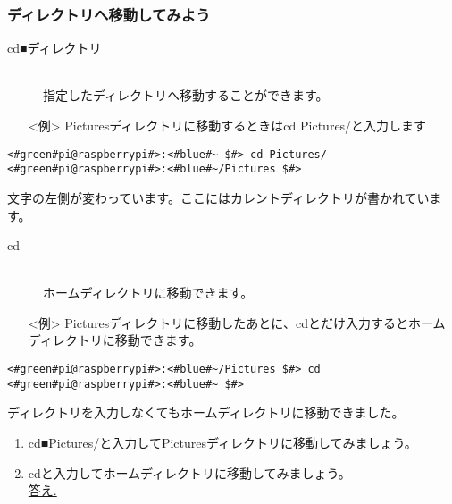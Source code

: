 \subsubsection{ディレクトリへ移動してみよう}
\begin{description}
\item[cd■ディレクトリ]\mbox{}\\
指定したディレクトリへ移動することができます。
\end{description}
\begin{itemize}
\item[<例>] Picturesディレクトリに移動するときはcd Pictures/と入力します
\end{itemize}

\begin{lstlisting}[caption=cd directoryの例, label=cdDir]
<#green#pi@raspberrypi#>:<#blue#~ $#> cd Pictures/
<#green#pi@raspberrypi#>:<#blue#~/Pictures $#>
\end{lstlisting}
文字の左側が変わっています。ここにはカレントディレクトリが書かれています。

\begin{description}
\item[cd]\mbox{}\\
ホームディレクトリに移動できます。
\end{description}
\begin{itemize}
\item[<例>] Picturesディレクトリに移動したあとに、cdとだけ入力するとホームディレクトリに移動できます。
\end{itemize}
\begin{lstlisting}[caption=cdの例, label=cd]
<#green#pi@raspberrypi#>:<#blue#~/Pictures $#> cd
<#green#pi@raspberrypi#>:<#blue#~ $#> 
\end{lstlisting}
ディレクトリを入力しなくてもホームディレクトリに移動できました。\\

\begin{tcolorbox}[title=\useOmetoi]
\begin{enumerate}
\item cd■Pictures/と入力してPicturesディレクトリに移動してみましょう。\\
\item cdと入力してホームディレクトリに移動してみましょう。\\
\underline{答え.\hspace{0.8\linewidth}}
\end{enumerate}
\end{tcolorbox}